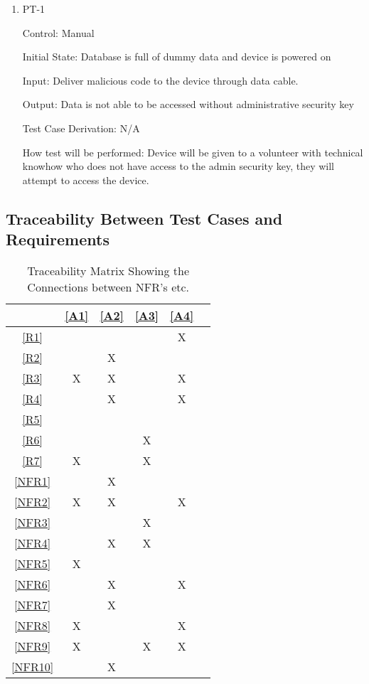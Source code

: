 \documentclass[12pt, titlepage]{article}
\begin{document}
\begin{enumerate}

\item{PT-1\\}

Control: Manual

Initial State: Database is full of dummy data and device is powered on

Input: Deliver malicious code to the device through data cable.

Output: Data is not able to be accessed without administrative security key

Test Case Derivation: N/A

How test will be performed: Device will be given to a volunteer with technical knowhow who does not have access to the admin security key, they will attempt to access the device.

\end{enumerate}



\subsection{Traceability Between Test Cases and Requirements}


\noindent
\begin{table}[h!]
\centering
\begin{tabular}{|c|c|c|c|c|c}
\hline
	& \ref{A1}& \ref{A2}& \ref{A3}& \ref{A4} \\
\hline          %
\ref{R1}       &   &   &   & X  \\ \hline
\ref{R2}       &   & X&   &    \\ \hline
\ref{R3}       & X& X&   & X  \\ \hline
\ref{R4}       &   & X&   & X  \\ \hline
\ref{R5}       &   &   &   &    \\ \hline
\ref{R6}       &   &   & X&    \\ \hline
\ref{R7}       & X&   & X&     \\ \hline
\ref{NFR1} &   & X&   &    \\ \hline
\ref{NFR2} & X& X&   & X \\ \hline
\ref{NFR3} &   &   & X&     \\ \hline
\ref{NFR4} &   & X& X&     \\ \hline
\ref{NFR5} &   X&   &   &      \\ \hline
\ref{NFR6} &   &  X &   &X     \\ \hline
\ref{NFR7} &   &  X &   &     \\ \hline
\ref{NFR8} &  X &   &   &X     \\ \hline
\ref{NFR9} & X  &   &X  &X      \\ \hline
\ref{NFR10}&  & X  &   &      \\
\hline
\end{tabular}
\caption{Traceability Matrix Showing the Connections between NFR's etc.}
\label{Table:A_trace}
\end{table}
\end{document}
